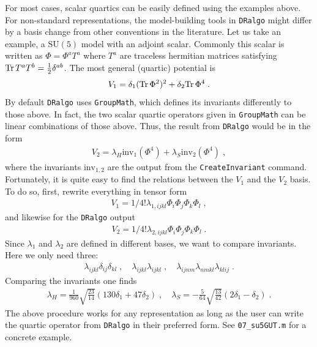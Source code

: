 \documentclass[11pt]{article}
\def\dralgo{{\tt DRalgo}}
\renewcommand{\tr}{{\rm Tr\,}}
\begin{document}
For most cases, scalar quartics can be easily defined using the examples above.
For non-standard representations,
the model-building tools in \dralgo{} might differ by
a basis change from other conventions in the literature.
Let us take an example,
a $\mathrm{SU}(5)$ model with an adjoint scalar.
Commonly this scalar is written as
$\Phi=\Phi^a T^a$ where
$T^a$ are traceless hermitian matrices satisfying
$\tr T^a T^b=\frac{1}{2}\delta^{ab}$.
The most general (quartic) potential is
\begin{align}
  V_1=
      \delta_1 (\tr\Phi^2)^2
    + \delta_2  \tr\Phi^4
    \;.
\end{align}
By default \dralgo{} uses {\tt GroupMath}, which defines its invariants differently to those above.
In fact,
the two scalar quartic operators given in {\tt GroupMath} can be
linear combinations of those above.
Thus,
the result from \dralgo{} would be in the form
\begin{align}
  V_2=
    \lambda_H \text{inv}_1^{ }(\Phi^4)
  + \lambda_S \text{inv}_2^{ }(\Phi^4)
  \;,
\end{align}
where
the invariants
$\text{inv}_{1,2}$ are the output from the {\tt CreateInvariant} command.
Fortunately,
it is quite easy to find the relations between the $V_1$ and the $V_2$ basis.
To do so, first, rewrite everything in tensor form
\begin{align}
V_1=1/4! \lambda_{1,ijkl}^{ }\Phi_i^{ } \Phi_j^{ } \Phi_k^{ } \Phi_l^{ }
  \;,
\end{align}
and likewise for the \dralgo{} output
\begin{align}
V_2=1/4! \lambda_{2,ijkl}^{ }\Phi_i^{ } \Phi_j^{ } \Phi_k^{ } \Phi_l^{ }
  \;.
\end{align}
Since
$\lambda_1$ and
$\lambda_2$ are defined in different bases,
we want to compare invariants.
Here we only need three:
\begin{align}
 \lambda_{ijkl}\delta_{ij} \delta_{kl}
  \;,\quad
 \lambda_{ijkl}\lambda_{ijkl}
  \;,\quad
 \lambda_{ijnm}\lambda_{nmkl}\lambda_{kl ij}
  \;.
\end{align}
Comparing the invariants one finds
\begin{align}
  \lambda_H=\frac{1}{960} \sqrt{\frac{23}{14}} (130 \delta_1+47 \delta_2)
  \;,\quad 
  \lambda_S=-\frac{5}{64} \sqrt{\frac{13}{42}} (2\delta_1-\delta_2)
  \;.
\end{align}
The above procedure works for any representation as long as
the user can write the quartic operator from \dralgo{} in their preferred form.
See {\tt 07\_su5GUT.m} for a concrete example.
\end{document}
